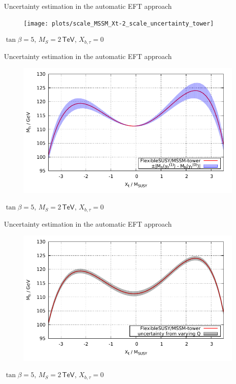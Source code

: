 \documentclass[hyperref={pdfpagelabels=false},ngerman]{beamer}
\newcommand{\eh}[1]{\,\mathsf{#1}}
\begin{document}
\begin{frame}{Uncertainty estimation in the automatic EFT approach}
  \begin{figure}
    \centering
    \texttt{[image: plots/scale\_MSSM\_Xt-2\_scale\_uncertainty\_tower]}
  \end{figure}
  $\tan\beta = 5$, $M_S = 2\eh{TeV}$, $X_{b,\tau} = 0$
\end{frame}


\begin{frame}{Uncertainty estimation in the automatic EFT approach}
  \begin{figure}
    \centering
    \includegraphics[width=\textwidth]{plots/xt_MSSM_MS-2000_tower}
  \end{figure}
  $\tan\beta = 5$, $M_S = 2\eh{TeV}$, $X_{b,\tau} = 0$
\end{frame}

\begin{frame}{Uncertainty estimation in the automatic EFT approach}
  \begin{figure}
    \centering
    \includegraphics[width=\textwidth]{plots/xt_MSSM_MS-2000_tower_scale_uncertainty}
  \end{figure}
  $\tan\beta = 5$, $M_S = 2\eh{TeV}$, $X_{b,\tau} = 0$
\end{frame}
\end{document}
